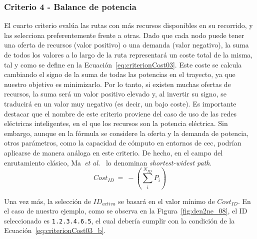 \subsubsection{Criterio 4 - Balance de potencia}

El cuarto criterio evalúa las rutas con más recursos disponibles en su recorrido, y las selecciona preferentemente frente a otras. Dado que cada nodo puede tener una oferta de recursos (valor positivo) o una demanda (valor negativo), la suma de todos los valores a lo largo de la ruta representará un coste total de la misma, tal y como se define en la Ecuación~\ref{eq:criterionCost03}. Este coste se calcula cambiando el signo de la suma de todas las potencias en el trayecto, ya que nuestro objetivo es minimizarlo. Por lo tanto, si existen muchas ofertas de recursos, la suma será un valor positivo elevado y, al invertir su signo, se traducirá en un valor muy negativo (es decir, un bajo coste). Es importante destacar que el nombre de este criterio proviene del caso de uso de las redes eléctricas inteligentes, en el que los recursos son la potencia eléctrica. Sin embargo, aunque en la fórmula se considere la oferta y la demanda de potencia, otros parámetros, como la capacidad de cómputo en entornos de \gls{cec}, podrían aplicarse de manera análoga en este criterio.  De hecho, en el campo del enrutamiento clásico, Ma~\textit{et al.}~\cite{Ma97} lo denominan \textit{shortest-widest path}.
\begin{equation}\label{eq:criterionCost03}
     Cost_{ID}  \: = \: -(\sum_{i}^{N_{ID}} P_{i})
\end{equation}

Una vez más, la selección de $ID_{activa}$ se basará en el valor mínimo de $Cost_{ID}$. En el caso de nuestro ejemplo, como se observa en la Figura~\ref{fig:den2ne_08}, el ID seleccionado es \texttt{1.2.3.4.6.5}, el cual debería cumplir con la condición de la Ecuación~\ref{eq:criterionCost03_b}.

